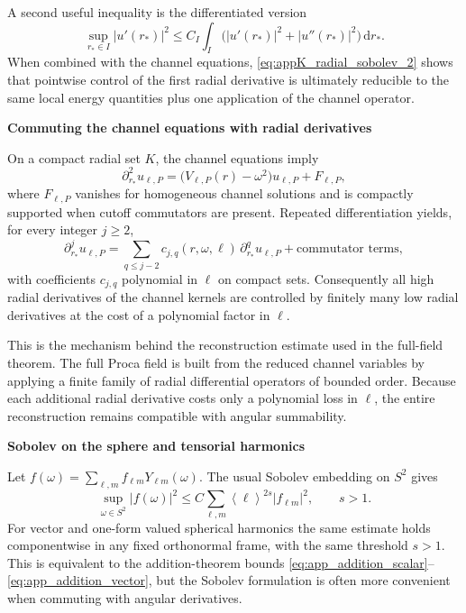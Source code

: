 \documentclass[12pt]{article}
\numberwithin{equation}{section}
\theoremstyle{plain}
\theoremstyle{definition}
\theoremstyle{remark}
\newcommand{\dd}{\mathrm d}
\newcommand{\om}{\omega}
\newcommand{\angles}[1]{\left\langle #1 \right\rangle}
\newcommand{\abs}[1]{\left|#1\right|}
\newcommand{\appheading}[1]{\par\medskip\noindent\textbf{#1}\par\smallskip\noindent}
\begin{document}
A second useful inequality is the differentiated version
\begin{equation}\label{eq:appK_radial_sobolev_2}
   \sup_{r_*\in I}\abs{u'(r_*)}^2
   \le
   C_I
   \int_I \bigl(\abs{u'(r_*)}^2+\abs{u''(r_*)}^2\bigr)\,\dd r_*.
\end{equation}
When combined with the channel equations, \eqref{eq:appK_radial_sobolev_2} shows that pointwise control of the first radial derivative is ultimately reducible to the same local energy quantities plus one application of the channel operator.

\appheading{Commuting the channel equations with radial derivatives}

On a compact radial set $K$, the channel equations imply
\[
   \partial_{r_*}^2u_{\ell,P}
   =
   \bigl(V_{\ell,P}(r)-\om^2\bigr)u_{\ell,P}+F_{\ell,P},
\]
where $F_{\ell,P}$ vanishes for homogeneous channel solutions and is compactly supported when cutoff commutators are present.  Repeated differentiation yields, for every integer $j\ge2$,
\begin{equation}\label{eq:appK_high_radial_derivative}
   \partial_{r_*}^j u_{\ell,P}
   =
   \sum_{q\le j-2} c_{j,q}(r,\om,\ell)\,\partial_{r_*}^q u_{\ell,P}
   + \text{commutator terms},
\end{equation}
with coefficients $c_{j,q}$ polynomial in $\ell$ on compact sets.  Consequently all high radial derivatives of the channel kernels are controlled by finitely many low radial derivatives at the cost of a polynomial factor in $\ell$.

This is the mechanism behind the reconstruction estimate used in the full-field theorem.  The full Proca field is built from the reduced channel variables by applying a finite family of radial differential operators of bounded order.  Because each additional radial derivative costs only a polynomial loss in $\ell$, the entire reconstruction remains compatible with angular summability.

\appheading{Sobolev on the sphere and tensorial harmonics}

Let $f(\omega)=\sum_{\ell,m}f_{\ell m}Y_{\ell m}(\omega)$.  The usual Sobolev embedding on $S^2$ gives
\begin{equation}\label{eq:appK_sphere_sobolev}
   \sup_{\omega\in S^2}\abs{f(\omega)}^2
   \le
   C\sum_{\ell,m}\angles{\ell}^{2s}\abs{f_{\ell m}}^2,
   \qquad
   s>1.
\end{equation}
For vector and one-form valued spherical harmonics the same estimate holds componentwise in any fixed orthonormal frame, with the same threshold $s>1$.  This is equivalent to the addition-theorem bounds \eqref{eq:app_addition_scalar}--\eqref{eq:app_addition_vector}, but the Sobolev formulation is often more convenient when commuting with angular derivatives.
\end{document}
